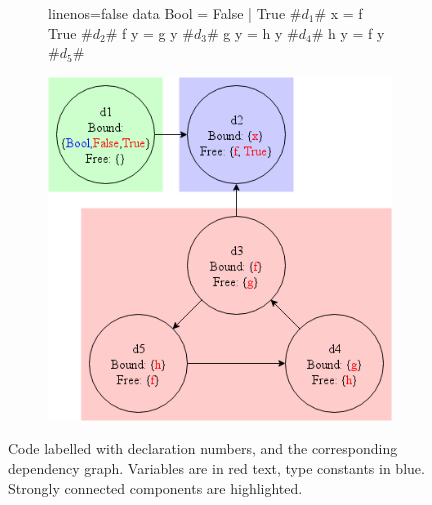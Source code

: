 \documentclass[dissertation.tex]{subfiles}
\begin{document}
{{{            \begin{figure}[h]
            \centering
            \begin{subfigure}[b]{0.45\textwidth}
                \begin{haskellfigure*}{linenos=false}
                data Bool = False | True      #\(d_1\)#
                x = f True                    #\(d_2\)#
                f y = g y                     #\(d_3\)#
                g y = h y                     #\(d_4\)#
                h y = f y                     #\(d_5\)#
                \end{haskellfigure*}
            \end{subfigure}
            \begin{subfigure}[b]{0.5\textwidth}
                \includegraphics[width=\textwidth]{figures/dependency_graph.png}
            \end{subfigure}
            \caption
            {
                Code labelled with declaration numbers, and the corresponding dependency graph. Variables are
                in red text, type constants in blue. Strongly connected components are highlighted.
            }
            \label{fig:dependency-graph}
            \end{figure}

}}}
\end{document}
